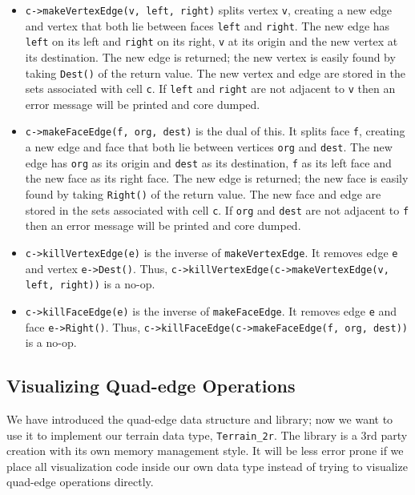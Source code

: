 \begin{itemize}
  \item \texttt{c->makeVertexEdge(v, left, right)} splits vertex \texttt{v},
  creating a new edge and vertex that both lie between faces \texttt{left} and
  \texttt{right}. The new edge has \texttt{left} on its left and \texttt{right}
  on its right, \texttt{v} at its origin and the new vertex at its destination.
  The new edge is returned; the new vertex is easily found by taking
  \texttt{Dest()} of the return value. The new vertex and edge are stored in the
  sets associated with cell \texttt{c}. If \texttt{left} and \texttt{right} are
  not adjacent to \texttt{v} then an error message will be printed and core
  dumped.
  \item \texttt{c->makeFaceEdge(f, org, dest)} is the dual of this. It splits
  face \texttt{f}, creating a new edge and face that both lie between vertices
  \texttt{org} and \texttt{dest}. The new edge has \texttt{org} as its origin
  and \texttt{dest} as its destination, \texttt{f} as its left face and the new
  face as its right face. The new edge is returned; the new face is easily found
  by taking \texttt{Right()} of the return value. The new face and edge are
  stored in the sets associated with cell \texttt{c}. If \texttt{org} and
  \texttt{dest} are not adjacent to \texttt{f} then an error message will be
  printed and core dumped.
  \item \texttt{c->killVertexEdge(e)} is the inverse of \texttt{makeVertexEdge}.
  It removes edge \texttt{e} and vertex \texttt{e->Dest()}. Thus,
  \texttt{c->killVertexEdge(c->makeVertexEdge(v, left, right))} is a no-op.
  \item \texttt{c->killFaceEdge(e)} is the inverse of \texttt{makeFaceEdge}. It
  removes edge \texttt{e} and face \texttt{e->Right()}. Thus,
  \texttt{c->killFaceEdge(c->makeFaceEdge(f, org, dest))} is a no-op.
\end{itemize}

\FloatBarrier
\subsection{Visualizing Quad-edge Operations}

We have introduced the quad-edge data structure and library; now we want to use
it to implement our terrain data type, \texttt{Terrain\_2r}. The library is a
3rd party creation with its own memory management style. It will be less error
prone if we place all visualization code inside our own data type instead of
trying to visualize quad-edge operations directly. 

